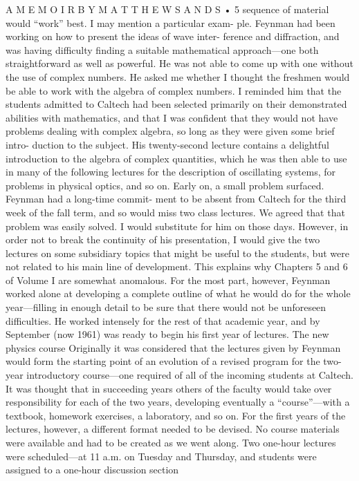 \documentclass[10pt,oneside]{article}
\begin{document}
A  M E M O I R  B Y  M A T T H E W  S A N D S • 5 sequence of material would “work” best. I may mention a particular exam- ple. Feynman had been working on how to present the ideas of wave inter- ference and diffraction, and was having difficulty finding a suitable mathematical approach---one both straightforward as well as powerful. He was not able to come up with one without the use of complex numbers. He asked me whether I thought the freshmen would be able to work with the algebra of complex numbers. I reminded him that the students admitted to Caltech had been selected primarily on their demonstrated abilities with mathematics, and that I was confident that they would not have problems dealing with complex algebra, so long as they were given some brief intro- duction to the subject. His twenty-second lecture contains a delightful introduction to the algebra of complex quantities, which he was then able to use in many of the following lectures for the description of oscillating systems, for problems in physical optics, and so on. Early on, a small problem surfaced. Feynman had a long-time commit- ment to be absent from Caltech for the third week of the fall term, and so would miss two class lectures. We agreed that that problem was easily solved. I would substitute for him on those days. However, in order not to break the continuity of his presentation, I would give the two lectures on some subsidiary topics that might be useful to the students, but were not related to his main line of development. This explains why Chapters 5 and 6 of Volume I are somewhat anomalous. For the most part, however, Feynman worked alone at developing a complete outline of what he would do for the whole year---filling in enough detail to be sure that there would not be unforeseen difficulties. He worked intensely for the rest of that academic year, and by September (now 1961) was ready to begin his first year of lectures. The new physics course Originally it was considered that the lectures given by Feynman would form the starting point of an evolution of a revised program for the two- year introductory course---one required of all of the incoming students at Caltech. It was thought that in succeeding years others of the faculty would take over responsibility for each of the two years, developing eventually a “course”---with a textbook, homework exercises, a laboratory, and so on. For the first years of the lectures, however, a different format needed to be devised. No course materials were available and had to be created as we went along. Two one-hour lectures were scheduled---at 11 a.m. on Tuesday and Thursday, and students were assigned to a one-hour discussion section\par
\end{document}

